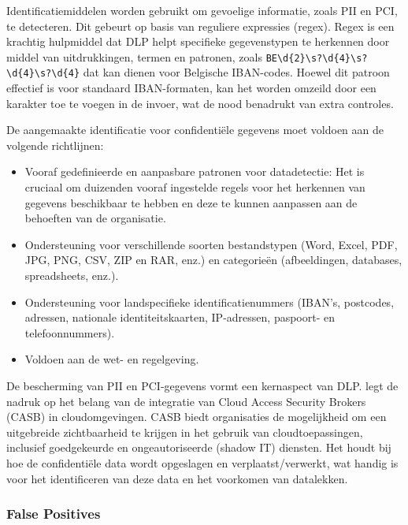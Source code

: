 Identificatiemiddelen worden gebruikt om gevoelige informatie, zoals PII en PCI, te detecteren. 
Dit gebeurt op basis van reguliere expressies (regex). 
Regex is een krachtig hulpmiddel dat DLP helpt specifieke gegevenstypen te herkennen door middel van uitdrukkingen, termen en patronen, 
zoals \texttt{BE\textbackslash d\{2\}\textbackslash s?\textbackslash d\{4\}\textbackslash s?\textbackslash d\{4\}\textbackslash s?\textbackslash d\{4\}} 
dat kan dienen voor Belgische IBAN-codes. Hoewel dit patroon effectief is voor standaard IBAN-formaten, kan het worden omzeild door een karakter toe te voegen in de invoer, 
wat de nood benadrukt van extra controles. 

De aangemaakte identificatie voor confidentiële gegevens moet voldoen aan de volgende richtlijnen:

\begin{itemize}
    \item Vooraf gedefinieerde en aanpasbare patronen voor datadetectie: Het is cruciaal om duizenden vooraf ingestelde regels voor het herkennen van gegevens beschikbaar te hebben en deze te kunnen aanpassen aan de behoeften van de organisatie.
    \item Ondersteuning voor verschillende soorten bestandstypen (Word, Excel, PDF, JPG, PNG, CSV, ZIP en RAR, enz.) en categorieën (afbeeldingen, databases, spreadsheets, enz.).
    \item Ondersteuning voor landspecifieke identificatienummers (IBAN's, postcodes, adressen, nationale identiteitskaarten, IP-adressen, pas\-poort- en telefoonnummers).
    \item Voldoen aan de wet- en regelgeving.
\end{itemize}

De bescherming van PII en PCI-gegevens vormt een kernaspect van DLP. \textcite{Wason2020CASB} legt de nadruk op het belang van de integratie van Cloud Access Security Brokers (CASB) in cloudomgevingen. 
CASB biedt organisaties de mogelijkheid om een uitgebreide zichtbaarheid te krijgen in het gebruik van cloudtoepassingen, inclusief goedgekeurde en ongeautoriseerde (shadow IT) diensten. 
Het houdt bij hoe de confidentiële data wordt opgeslagen en verplaatst/verwerkt, wat handig is voor het identificeren van deze data en het voorkomen van datalekken.

\subsubsection{False Positives}

